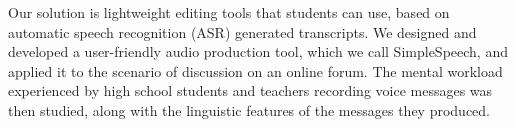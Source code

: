 Our solution is lightweight editing tools that students can use, based on automatic speech recognition (ASR) generated transcripts.
We designed and developed a user-friendly audio production tool, which we call SimpleSpeech, and applied it to the scenario of discussion on an online forum. 
The mental workload experienced by high school students and teachers recording voice messages was then studied, along with the linguistic features of the messages they produced.
